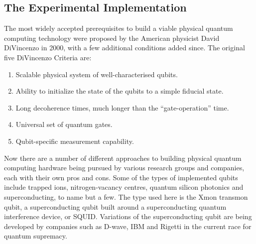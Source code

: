 \documentclass[12pt]{article}
\begin{document}
\subsection{The Experimental Implementation}

The most widely accepted prerequisites to build a viable physical quantum computing technology were proposed by the American physicist
David DiVincenzo in 2000, with a few additional conditions added since. The original five DiVincenzo Criteria are:

\begin{enumerate}
\item Scalable physical system of well-characterised qubits.
\item Ability to initialize the state of the qubits to a simple fiducial state.
\item Long decoherence times, much longer than the “gate-operation” time.
\item Universal set of quantum gates.
\item Qubit-specific measurement capability.
\end{enumerate}

Now there are a number of different approaches to building physical quantum computing hardware being pursued by various research groups
and companies, each with their own pros and cons. Some of the types of implemented qubits include trapped ions, nitrogen-vacancy centres,
 quantum silicon photonics and superconducting, to name but a few. The type used here is the Xmon transmon qubit, a superconducting qubit
  built around a superconducting quantum interference device, or SQUID. Variations of the superconducting qubit are being developed by
  companies such as D-wave, IBM and Rigetti in the current race for quantum supremacy.
\end{document}
